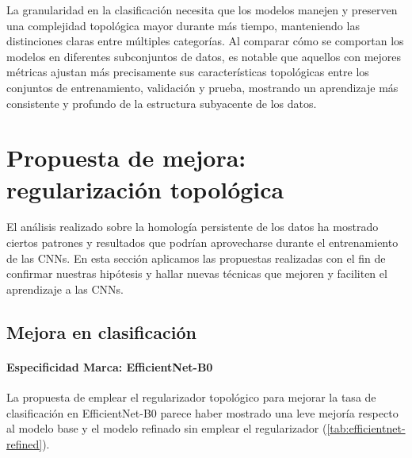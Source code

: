 La granularidad en la clasificación necesita que los modelos manejen y preserven
una complejidad topológica mayor durante más tiempo, manteniendo las
distinciones claras entre múltiples categorías. Al comparar cómo se comportan los
modelos en diferentes subconjuntos de datos, es notable que aquellos con mejores
métricas ajustan más precisamente sus características topológicas entre los
conjuntos de entrenamiento, validación y prueba, mostrando un aprendizaje más
consistente y profundo de la estructura subyacente de los datos.

\section{Propuesta de mejora: regularización topológica}
\label{subsec:proposal}

El análisis realizado sobre la homología persistente de los datos ha mostrado ciertos
patrones y resultados que podrían aprovecharse durante el entrenamiento de las CNNs.
En esta sección aplicamos las propuestas realizadas con el fin de confirmar
nuestras hipótesis y hallar nuevas técnicas que mejoren y faciliten el
aprendizaje a las CNNs.

\subsection{Mejora en clasificación}

\paragraph{Especificidad Marca: EfficientNet-B0}

La propuesta de emplear el regularizador topológico para mejorar la tasa de clasificación
en EfficientNet-B0 parece haber mostrado una leve mejoría respecto al modelo base
y el modelo refinado sin emplear el regularizador (\autoref{tab:efficientnet-refined}).

